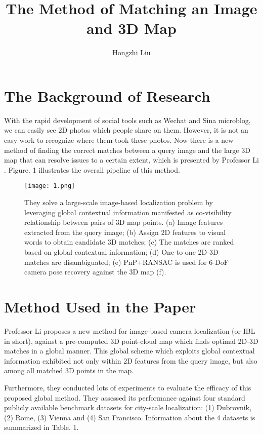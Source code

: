 \documentclass{article}
\author{Hongzhi Liu}
\title{The Method of Matching an Image and 3D Map}
\begin{document}
	\maketitle
	\par
	\section{The Background of Research}
    With the rapid development of social tools such as Wechat and Sina microblog, we can easily see 2D photos which people share on them. However, it is not an easy work to recognize where them took these photos. Now there is a new method of finding the correct matches between a query image and the large 3D map that can resolve issues to a certain extent, which is presented by Professor Li \cite{Liu2017Efficient}. Figure. 1 illustrates the overall pipeline of this method.
	
	\begin{figure}[ht]
		\centering
		\texttt{[image: 1.png]}
		\caption{They solve a large-scale image-based localization problem by leveraging global contextual information manifested as co-visibility relationship between pairs of 3D map points. (a) Image features extracted from the query image; (b) Assign 2D features to visual words to obtain candidate 3D matches; (c) The matches are ranked based on global contextual information; (d) One-to-one 2D-3D matches are disambiguated; (e) PnP+RANSAC is used for 6-DoF camera pose recovery against the 3D map (f).}
	\end{figure}

	
	\section{Method Used in the Paper}
	
    Professor Li proposes a new method for image-based camera localization (or IBL in short), against a pre-computed 3D point-cloud map which finds optimal 2D-3D matches in a global manner. This global scheme which exploits global contextual information exhibited not only within 2D features from the query image, but also among all matched 3D points in the map.

    Furthermore, they conducted lots of experiments to evaluate the efficacy of this proposed global method. They assessed its performance against four standard publicly available benchmark datasets for city-scale localization: (1) Dubrovnik, (2) Rome, (3) Vienna and (4) San Francisco. Information about the 4 datasets is summarized in Table. 1.
\end{document}
